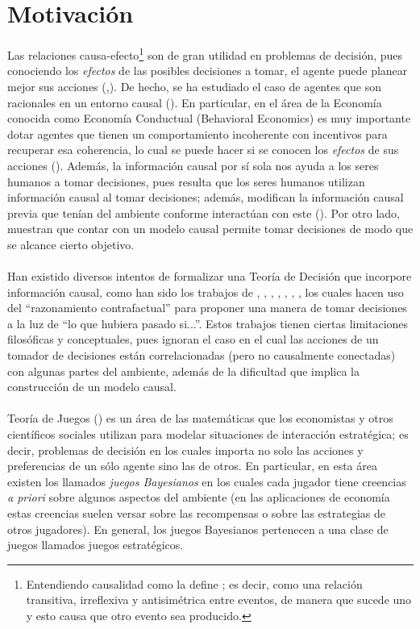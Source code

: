 \documentclass[11pt]{article}
\theoremstyle{plain}
\begin{document}
\section{Motivación}
Las relaciones causa-efecto\footnote{Entendiendo causalidad como la define \cite{spirtes2000causation}; es decir, como una relación transitiva, irreflexiva y antisimétrica entre eventos, de manera que sucede uno y esto causa que otro evento sea producido.} son de gran utilidad en problemas de decisión, pues conociendo los \textit{efectos} de las posibles decisiones a tomar, el agente puede planear mejor sus acciones (\cite{hagmayer2013repeated},\cite{pearlwhy}). De hecho, se ha estudiado el caso de agentes que son racionales en un entorno causal (\cite{board2006equivalence}). En particular, en el área de la Economía conocida como Economía Conductual (Behavioral Economics) es muy importante dotar agentes que tienen un comportamiento incoherente con incentivos para recuperar esa coherencia, lo cual se puede hacer si se conocen los \textit{efectos} de sus acciones (\cite{kleinberg2014time}). Además, la información causal por sí sola nos ayuda a los seres humanos a tomar decisiones, pues resulta que los seres humanos utilizan información causal al tomar decisiones; además, modifican la información causal previa que tenían del ambiente conforme interactúan con este (\cite{hagmayer2013repeated}). Por otro lado, \cite{lattimoreNIPS2016} muestran que contar con un modelo causal permite tomar decisiones de modo que se alcance cierto objetivo.\\
\\
Han existido diversos intentos de formalizar una Teoría de Decisión que incorpore información causal, como han sido los trabajos de \cite{joyce1999foundations}, \cite{board2006equivalence}, \cite{joyce2012regret}, \cite{ahmed2012push}, \cite{rottman2014reasoning}, \cite{soares2015toward}, \cite{stalnaker2016knowledge}, los cuales hacen uso del “razonamiento contrafactual” para proponer una manera de tomar decisiones a la luz de “lo que hubiera pasado si...”. Estos trabajos tienen ciertas limitaciones filosóficas y conceptuales, pues ignoran el caso en el cual las acciones de un tomador de decisiones están correlacionadas (pero no causalmente conectadas) con algunas partes del ambiente, además de la dificultad que implica la construcción de un modelo causal. \\
\\
Teoría de Juegos (\cite{osborne1994course}) es un área de las matemáticas que los economistas y otros científicos sociales utilizan para modelar situaciones de interacción estratégica; es decir, problemas de decisión en los cuales importa no solo las acciones y preferencias de un sólo agente sino las de otros. En particular, en esta área existen los llamados \textit{juegos Bayesianos} en los cuales cada jugador tiene creencias \textit{a priori} sobre algunos aspectos del ambiente (en las aplicaciones de economía estas creencias suelen versar sobre las recompensas o sobre las estrategias de otros jugadores). En general, los juegos Bayesianos pertenecen a una clase de juegos llamados juegos estratégicos.\\
\end{document}
